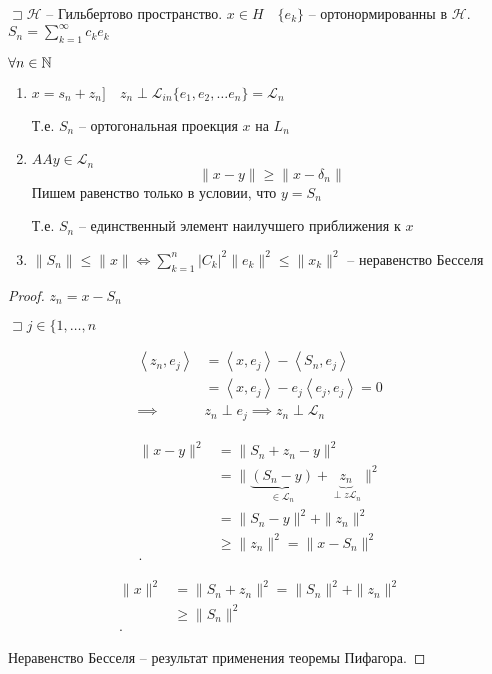 \begin{theorem}

    $\sqsupset \mathcal{H}$ -- Гильбертово пространство. $x\in H\quad \{e_k\}$ -- ортонормированны в $\mathcal{H}$. $S_n = \sum_{k=1}^{\infty } c_k e_k$

    $\forall  n\in \mathbb{N} $
    \begin{enumerate}
        \item $x = s_n + z_n]\quad z_n \perp \mathcal L_{in} \{e_1, e_2,\ldots e_n\} = \mathcal L_n$

        Т.е. $S_n$ -- ортогональная проекция $x$ на $L_n$
        \item $AA y\in \mathcal L_n$ \[ \|x-y\| \geqslant \|x - \delta_n\|\]
        Пишем равенство только в условии, что $y = S_n$

        Т.е. $S_n$ -- единственный элемент наилучшего приближения к $x$
        \item $\|S_n\| \leqslant  \|x\| \iff \sum_{k=1}^{n} |C_k|^2 \|e_k\|^2 \leqslant \|x_k\|^2$ -- неравенство Бесселя
    \end{enumerate}
\end{theorem}
\begin{proof}
    $z_n = x - S_n$

    $\sqsupset j\in \{1, \ldots, n$

    \begin{align*}
        \left<z_n, e_j \right> &= \left<x, e_j \right> - \left<S_n, e_j \right>\\
        &= \left<x, e_j \right> - e_j \left<e_j, e_j \right> = 0  \\
        \implies & z_n \perp e_j \implies z_n \perp \mathcal L_n\end{align*}

    \begin{align*}
        \|x - y\|^2 &=  \|S_n + z_n - y\|^2 \\
        &= \|\underbrace{\left( S_n - y \right)}_{\in \mathcal L_n}  + \underbrace{z_n}_{\perp z\mathcal L_n}\|^2 \\
        &= \|S_n - y\|^2 + \|z_n\|^2 \\
        &\geqslant \|z_n\|^2 = \|x - S_n\|^2\\
    .\end{align*}

    \begin{align*}
        \|x\|^2 &= \|S_n + z_n\|^2 = \|S_n\|^2 + \|z_n\|^2\\
        &\geqslant \|S_n\|^2 \\
    .\end{align*}

    Неравенство Бесселя -- результат применения теоремы Пифагора.
\end{proof}

